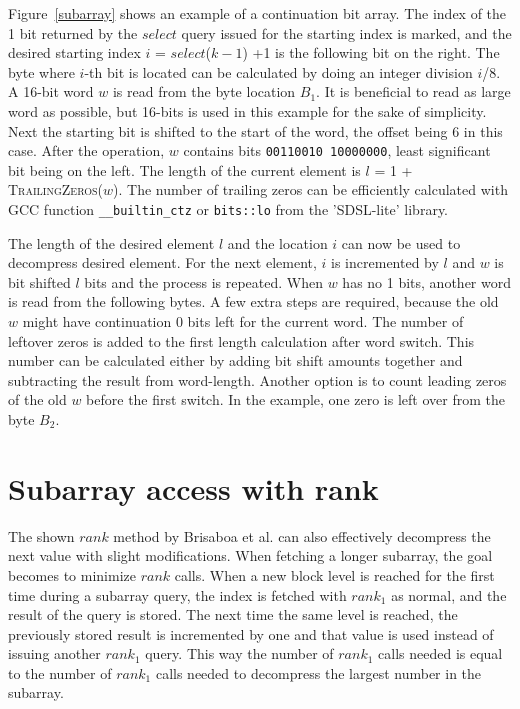 Figure~\ref{subarray} shows an example of a continuation bit array. The index of the 1 bit returned by the $select$ query issued for the starting index is marked, and the desired starting index 
$i$ = $select$($k-1$) +1 is the following bit on the right. The byte where $i$-th bit is located can be calculated by doing an integer division $i$/8. A 16-bit word $w$ is read from the byte location $B_1$.
It is beneficial to read as large word as possible, but 16-bits is used in this example for the sake of simplicity. Next the starting bit is shifted to the start of the word, the offset being 6 in this case. 
After the operation, $w$ contains bits \texttt{00110010 10000000}, least significant bit being on the left. The length of the current element is $l$ = 1 + \textsc{TrailingZeros}($w$). The number of 
trailing zeros can be efficiently calculated with GCC function \texttt{\_\_builtin\_ctz} or \texttt{bits::lo} from the 'SDSL-lite' library.

The length of the desired element $l$ and the location $i$ can now be used to decompress desired element. For the next element, $i$ is incremented by $l$ and $w$ is bit shifted $l$ bits and the process is 
repeated. When $w$ has no 1 bits, another word is read from the following bytes. A few extra steps are required, because the old $w$ might have continuation 0 bits left for the current word. The number of leftover 
zeros is added to the first length calculation after word switch. This number can be calculated either by adding bit shift amounts together and subtracting the result from word-length. Another option is to count 
leading zeros of the old $w$ before the first switch. In the example, one zero is left over from the byte $B_2$.

\section{Subarray access with rank}
The shown $rank$ method by Brisaboa et al. can also effectively decompress the next value with slight modifications. When fetching a longer subarray, the goal becomes to minimize $rank$ calls. 
When a new block level is reached for the first time during a subarray query, the index is fetched with $rank_1$ as normal, and the result of the query is stored. The next time the same level is reached, the
previously stored result is incremented by one and that value is used instead of issuing another $rank_1$ query. This way the number of $rank_1$ calls needed is equal to the number of $rank_1$ calls 
needed to decompress the largest number in the subarray.

